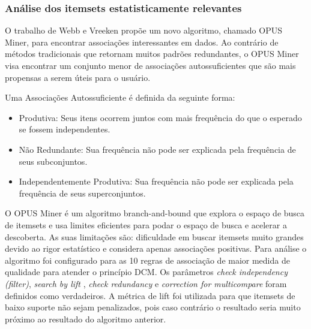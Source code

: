 \documentclass[12pt]{article}
\begin{document}
\subsubsection{Análise dos itemsets estatisticamente relevantes}
O trabalho de Webb e Vreeken \cite{webb2013efficient} propõe um novo algoritmo, chamado OPUS Miner, para encontrar associações interessantes em dados. Ao contrário de métodos tradicionais que retornam muitos padrões redundantes, o OPUS Miner visa encontrar um conjunto menor de associações autossuficientes que são mais propensas a serem úteis para o usuário. 

Uma Associações Autossuficiente é definida da seguinte forma: 
\begin{itemize}
    \item Produtiva: Seus itens ocorrem juntos com mais frequência do que o esperado se fossem independentes.
    \item Não Redundante: Sua frequência não pode ser explicada pela frequência de seus subconjuntos. 
    \item Independentemente Produtiva: Sua frequência não pode ser explicada pela frequência de seus superconjuntos. 
\end{itemize}

O OPUS Miner é um algoritmo branch-and-bound que explora o espaço de busca de itemsets e usa limites eficientes para podar o espaço de busca e acelerar a descoberta. As suas limitações são: dificuldade em buscar itemsets muito grandes devido ao rigor estatístico e considera apenas associações positivas. Para análise o algoritmo foi configurado para as 10 regras de associação de maior medida de qualidade para atender o princípio DCM. Os parâmetros \textit{check independency (filter)}, \textit{search by lift} \cite{wiki:lift}, \textit{check redundancy} e \textit{correction for multicompare} foram definidos como verdadeiros. A métrica de lift foi utilizada para que itemsets de baixo suporte não sejam penalizados, pois caso contrário o resultado seria muito próximo ao resultado do algoritmo anterior.
\end{document}
